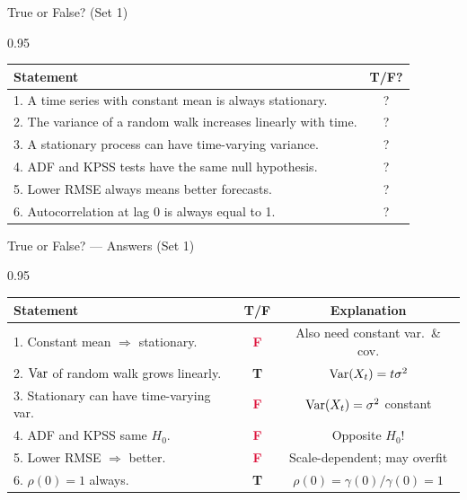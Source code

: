 \documentclass[9pt, aspectratio=169, t]{beamer}
\begin{document}
\begin{frame}{True or False? (Set 1)}
    \begin{cminipage}{0.95\textwidth}
    \footnotesize
    \begin{center}
    \begin{tabular}{p{9cm}c}
        \toprule
        \textbf{Statement} & \textbf{T/F?} \\
        \midrule
        1. A time series with constant mean is always stationary. & ? \\[0.15cm]
        2. The variance of a random walk increases linearly with time. & ? \\[0.15cm]
        3. A stationary process can have time-varying variance. & ? \\[0.15cm]
        4. ADF and KPSS tests have the same null hypothesis. & ? \\[0.15cm]
        5. Lower RMSE always means better forecasts. & ? \\[0.15cm]
        6. Autocorrelation at lag 0 is always equal to 1. & ? \\
        \bottomrule
    \end{tabular}
    \end{center}
    \end{cminipage}
\end{frame}

\begin{frame}{True or False? --- Answers (Set 1)}
    \begin{cminipage}{0.95\textwidth}
    \scriptsize
    \begin{center}
    \begin{tabular}{p{7.5cm}cc}
        \toprule
        \textbf{Statement} & \textbf{T/F} & \textbf{Explanation} \\
        \midrule
        1. Constant mean $\Rightarrow$ stationary. & \textcolor{Crimson}{\textbf{F}} & {\tiny Also need constant var.\ \& cov.} \\[0.08cm]
        2. $\text{Var}$ of random walk grows linearly. & \textcolor{Forest}{\textbf{T}} & {\tiny $\text{Var}(X_t) = t\sigma^2$} \\[0.08cm]
        3. Stationary can have time-varying var. & \textcolor{Crimson}{\textbf{F}} & {\tiny $\text{Var}(X_t) = \sigma^2$ constant} \\[0.08cm]
        4. ADF and KPSS same $H_0$. & \textcolor{Crimson}{\textbf{F}} & {\tiny Opposite $H_0$!} \\[0.08cm]
        5. Lower RMSE $\Rightarrow$ better. & \textcolor{Crimson}{\textbf{F}} & {\tiny Scale-dependent; may overfit} \\[0.08cm]
        6. $\rho(0) = 1$ always. & \textcolor{Forest}{\textbf{T}} & {\tiny $\rho(0) = \gamma(0)/\gamma(0) = 1$} \\
        \bottomrule
    \end{tabular}
    \end{center}
    \end{cminipage}
\end{frame}
\end{document}
